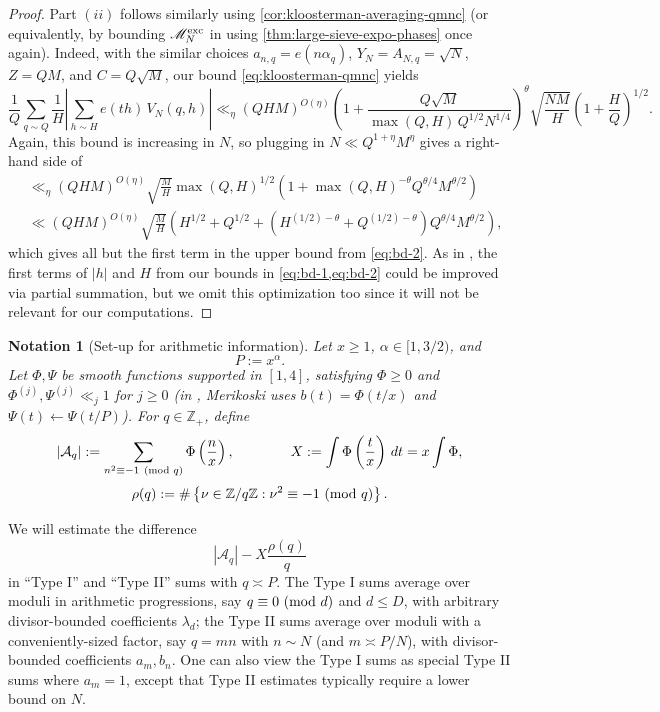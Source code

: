 \documentclass[reqno,11pt]{amsart}
\newtheorem{notation}[theorem]{Notation}
\theoremstyle{remark}
\numberwithin{equation}{section}
\newcommand{\Z}{\mathbb{Z}}
\newcommand{\mA}{\mathcal{A}}
\renewcommand{\pmod}[1]{\ (\textnormal{mod } #1)}
\begin{document}
\begin{proof}
Part $(ii)$ follows similarly using \cref{cor:kloosterman-averaging-qmnc} (or equivalently, by bounding $\mathscr{M}_N^{\textnormal{exc}}$ in \cite[\S 8.1.12]{de2020niveau} using \cref{thm:large-sieve-expo-phases} once again). Indeed, with the similar choices $a_{n,q} = e(n\alpha_q)$, $Y_N = A_{N,q} = \sqrt{N}$, $Z = QM$, and $C = Q\sqrt{M}$, our bound \cref{eq:kloosterman-qmnc} yields 
\[
    \frac{1}{Q} \sum_{q \sim Q} \frac{1}{H} \left\vert \sum_{h \sim H} e(th)\, V_N(q, h)\right\vert
    \ll_\eta 
    (QHM)^{O(\eta)}
    \left(1 + \frac{Q\sqrt{M}}{\max(Q, H)\, Q^{1/2} N^{1/4}}\right)^\theta \sqrt{\frac{NM}{H}}
    \left(1 + \frac{H}{Q}\right)^{1/2}.
\]
Again, this bound is increasing in $N$, so plugging in $N \ll Q^{1+\eta} M^\eta$ gives a right-hand side of
\[
\begin{aligned}
    &\ll_\eta 
    (QHM)^{O(\eta)} \sqrt{\frac{M}{H}} \max(Q, H)^{1/2} \left(1 + \max(Q, H)^{-\theta} Q^{\theta/4} M^{\theta/2}\right)
    \\
    &\ll
    (QHM)^{O(\eta)} \sqrt{\frac{M}{H}} \left(H^{1/2} + Q^{1/2} + \left(H^{(1/2)-\theta} + Q^{(1/2)-\theta}\right) Q^{\theta/4} M^{\theta/2}\right),
\end{aligned}
\]
which gives all but the first term in the upper bound from \cref{eq:bd-2}.
As in \cite{de2020niveau}, the first terms of $|h|$ and $H$ from our bounds in \cref{eq:bd-1,eq:bd-2} could be improved via partial summation, but we omit this optimization too since it will not be relevant for our computations.
\end{proof}

\begin{notation}[Set-up for arithmetic information] \label{not:set-up-info}
Let $x \ge 1$, $\alpha \in [1, 3/2)$, and
\[
    P := x^\alpha.
\] 
Let $\Phi, \Psi$ be smooth functions supported in $[1, 4]$, satisfying $\Phi \ge 0$ and $\Phi^{(j)}, \Psi^{(j)} \ll_j 1$ for $j \ge 0$ (in \cite[\S 2.1]{merikoski2023largest}, Merikoski uses $b(t) = \Phi(t/x)$ and $\Psi(t) \gets \Psi(t/P)$). For $q \in \Z_+$, define
\[
    |\mA_q| := \sum_{n^2 \equiv -1 \pmod{q}} \Phi\left(\frac{n}{x}\right),
    \qquad\qquad 
    X := \int \Phi\left(\frac{t}{x}\right)\, dt
    = 
    x \int \Phi,
\]
\[
    \rho(q) := \# \left\{ \nu \in \Z/q\Z : \nu^2 \equiv -1 \pmod{q} \right\}.
\]
\end{notation}


We will estimate the difference 
\[
    |\mA_q| - X\frac{\rho(q)}{q}
\] 
in ``Type I'' and ``Type II'' sums with $q \asymp P$. The Type I sums average over moduli in arithmetic progressions, say $q \equiv 0 \pmod{d}$ and $d \le D$, with arbitrary divisor-bounded coefficients $\lambda_d$; the Type II sums average over moduli with a conveniently-sized factor, say $q = mn$ with $n \sim N$ (and $m \asymp P/N$), with divisor-bounded coefficients $a_m, b_n$. One can also view the Type I sums as special Type II sums where $a_m = 1$, except that Type II estimates typically require a lower bound on $N$.
\end{document}
